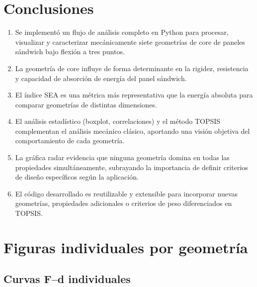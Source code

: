 \documentclass[12pt, a4paper, twocolumn]{article}
\begin{document}
\section{Conclusiones}

\begin{enumerate}
    \item Se implementó un flujo de análisis completo en Python para procesar,
    visualizar y caracterizar mecánicamente siete geometrías de core de paneles
    sándwich bajo flexión a tres puntos.

    \item La geometría de core influye de forma determinante en la rigidez,
    resistencia y capacidad de absorción de energía del panel sándwich.

    \item El índice SEA es una métrica más representativa que la energía absoluta
    para comparar geometrías de distintas dimensiones.

    \item El análisis estadístico (boxplot, correlaciones) y el método TOPSIS
    complementan el análisis mecánico clásico, aportando una visión objetiva del
    comportamiento de cada geometría.

    \item La gráfica radar evidencia que ninguna geometría domina en todas las
    propiedades simultáneamente, subrayando la importancia de definir criterios
    de diseño específicos según la aplicación.

    \item El código desarrollado es reutilizable y extensible para incorporar nuevas
    geometrías, propiedades adicionales o criterios de peso diferenciados en TOPSIS.
\end{enumerate}

\clearpage
\section{Figuras individuales por geometría}
\label{sec:individuales}

\subsection{Curvas F--d individuales}
\end{document}
